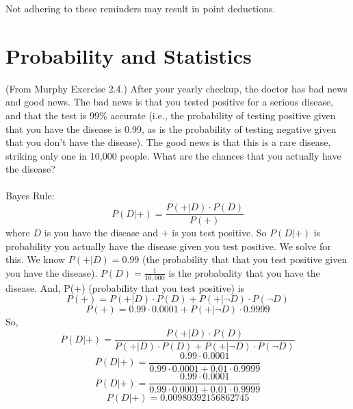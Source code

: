 \documentclass{article}
\begin{document}
Not adhering to these reminders may result in point deductions. \\



\clearpage{}



\section*{Probability and Statistics}
\begin{aprob}
     (From Murphy Exercise 2.4.)
    After your yearly checkup, the doctor has bad news and good news.
    The bad news is that you tested positive for a serious disease, and that the test is 99\% accurate (i.e., the probability of testing positive given that you have the disease is 0.99, as is the probability of testing negative given that you don't have the disease).
    The good news is that this is a rare disease, striking only one in 10,000 people.
    What are the chances that you actually have the disease?
    \\ \\
              Bayes Rule: \[ P(D|+) = \frac{P(+|D) \cdot P(D)}{P(+)} \]
              where $D$ is you have the disease and $+$ is you test positive. So $P(D|+)$ is probability you actually have the disease given you test positive. We solve for this.
              We know $P(+|D) = 0.99$ (the probability that that you test positive given you have the disease). $P(D) = \frac{1}{10,000}$ is the probabality that you have the disease.
              And, P(+) (probability that you test positive) is
              \[ P(+) = P(+|D)\cdot P(D) + P(+|\neg D)\cdot P(\neg D)\]
              \[ P(+) = 0.99 \cdot 0.0001 + P(+|\neg D)\cdot 0.9999 \]
              So,
              \[ P(D|+) = \frac{P(+|D) \cdot P(D)}{P(+|D) \cdot P(D)+ P(+|\neg D) \cdot P(\neg D)}\]
              \[ P(D|+) = \frac{0.99 \cdot 0.0001}{0.99 \cdot 0.0001+ 0.01 \cdot 0.9999}\]
              \[ P(D|+) = \frac{0.99 \cdot 0.0001}{0.99 \cdot 0.0001+ 0.01 \cdot 0.9999}\]
              \[ \boxed{P(D|+) = 0.00980392156862745} \]
\end{aprob}
\end{document}
